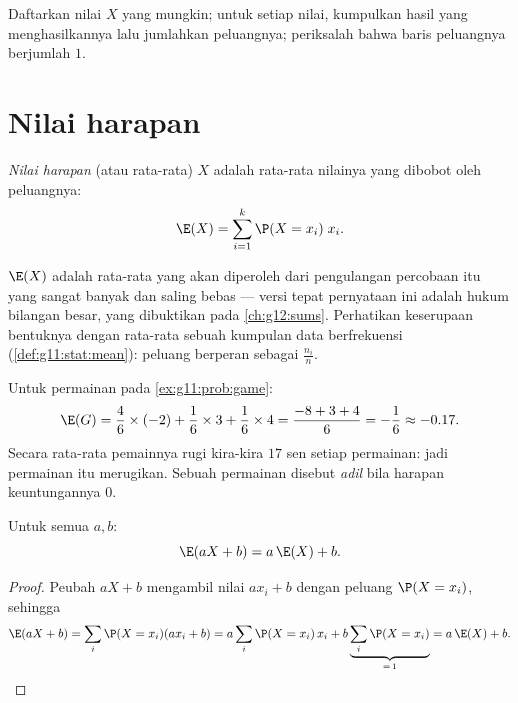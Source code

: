 \begin{method}\label{met:g11:prob:table}
Daftarkan nilai $X$ yang mungkin; untuk setiap nilai, kumpulkan hasil yang
menghasilkannya lalu jumlahkan peluangnya; periksalah bahwa baris
peluangnya berjumlah $1$.
\end{method}

\section{Nilai harapan}

\begin{definition}\label{def:g11:prob:expectation}
\emph{Nilai harapan} (atau rata-rata) $X$ adalah rata-rata
nilainya yang dibobot oleh peluangnya:
\[
\E(X) = \sum_{i=1}^{k} \P(X = x_i)\; x_i .
\]
\end{definition}

\begin{remark}
$\E(X)$ adalah rata-rata yang akan diperoleh dari pengulangan percobaan itu
yang sangat banyak dan saling bebas --- versi tepat pernyataan ini adalah
hukum bilangan besar, yang dibuktikan pada \cref{ch:g12:sums}. Perhatikan
keserupaan bentuknya dengan rata-rata sebuah kumpulan data berfrekuensi
(\cref{def:g11:stat:mean}): peluang berperan sebagai  $\frac{n_i}{n}$.
\end{remark}

\begin{example}\label{ex:g11:prob:gameexp}
Untuk permainan pada \cref{ex:g11:prob:game}:
\[
\E(G) = \frac46 \times (-2) + \frac16 \times 3 + \frac16 \times 4
= \frac{-8 + 3 + 4}{6} = -\frac16 \approx -0.17 .
\]
Secara rata-rata pemainnya rugi kira-kira $17$ sen setiap permainan: jadi
permainan itu merugikan. Sebuah permainan disebut \emph{adil} bila harapan keuntungannya $0$.
\end{example}

\begin{proposition}[Kelinearan]\label{prop:g11:prob:linearity}
Untuk semua  $a, b$:
\[
\E(aX + b) = a\,\E(X) + b .
\]
\end{proposition}

\begin{proof}
Peubah $aX + b$ mengambil nilai $a x_i + b$ dengan peluang
$\P(X = x_i)$, sehingga
\[
\E(aX + b) = \sum_i \P(X = x_i)(a x_i + b)
= a \sum_i \P(X = x_i)\,x_i + b \underbrace{\sum_i \P(X =
x_i)}_{=\,1} = a\,\E(X) + b .
\]
\end{proof}

